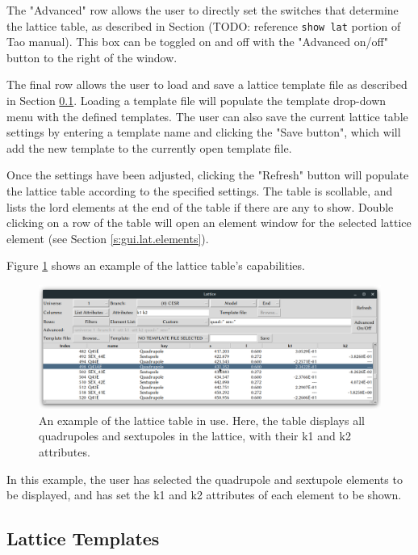 The "Advanced" row allows the user to directly set the switches that determine the lattice table, as described in Section (TODO: reference \texttt{show lat} portion of Tao manual).
This box can be toggled on and off with the "Advanced on/off" button to the right of the window.

The final row allows the user to load and save a lattice template file as described in Section \ref{s:gui.lat.templates}.
Loading a template file will populate the template drop-down menu with the defined templates.
The user can also save the current lattice table settings by entering a template name and clicking the "Save button", which will add the new template to the currently open template file.

Once the settings have been adjusted, clicking the "Refresh" button will populate the lattice table according to the specified settings.
The table is scollable, and lists the lord elements at the end of the table if there are any to show.
Double clicking on a row of the table will open an element window for the selected lattice element (see Section \ref{s:gui.lat.elements}).

Figure \ref{fig:gui.lat.table.example} shows an example of the lattice table's capabilities.
\begin{figure}
\centering
\includegraphics[width=12cm]{figures/lat_table_example.png}
\caption{An example of the lattice table in use.
Here, the table displays all quadrupoles and sextupoles in the lattice, with their k1 and k2 attributes.}
\label{fig:gui.lat.table.example}
\end{figure}
In this example, the user has selected the quadrupole and sextupole elements to be displayed, and has set the k1 and k2 attributes of each element to be shown.


\subsection{Lattice Templates}
\label{s:gui.lat.templates}

